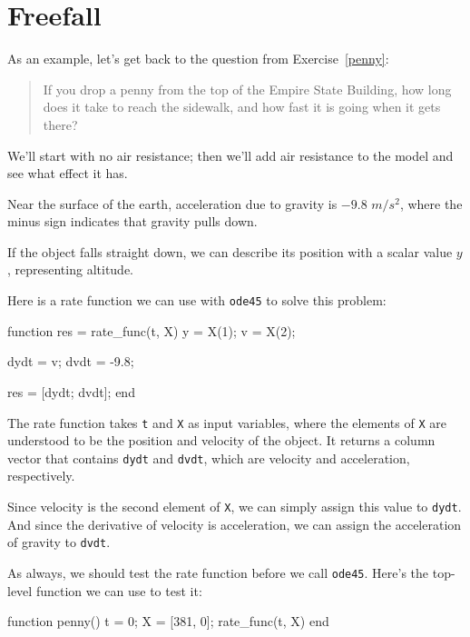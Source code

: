 \documentclass[
]{book}
\numberwithin{Answer}{chapter}
\numberwithin{Exercise}{chapter}
\begin{document}
\section{Freefall}
\label{sect:freefall}

As an example, let's get back to the question from Exercise~\ref{penny}:

\begin{quote}
If you drop a penny from the top of the Empire State Building, how long does it take to reach the sidewalk, and how fast it is going when it gets there?
\end{quote}

We'll start with no air resistance; then we'll add air resistance to the model and see what effect it has.

Near the surface of the earth,
acceleration due to gravity is $-9.8$ $m/s^2$, where the minus sign
indicates that gravity pulls down.

If the object falls straight down, we can describe its position with a
scalar value $y$, representing altitude.

Here is a rate function we can use with {\tt ode45} to solve
this problem:

\begin{code}
function res = rate_func(t, X)
    y = X(1);      
    v = X(2);      
    
    dydt = v;
    dvdt = -9.8;

    res = [dydt; dvdt];
end
\end{code}

The rate function takes {\tt t} and {\tt X} as input variables, where the elements of {\tt X} are understood to be the position and velocity of the object.
It returns a column vector that contains {\tt dydt} and {\tt dvdt}, which
are velocity and acceleration, respectively.

Since velocity is the second element of {\tt X}, we can simply assign this value to {\tt dydt}.
And since the derivative of velocity is acceleration, we can assign the acceleration of gravity to {\tt dvdt}.

As always, we should test the rate function before we call {\tt ode45}.  Here's the top-level function we can use to test it:

\begin{code}
function penny()
   t = 0;
   X = [381, 0];
   rate_func(t, X)
end
\end{code}
\end{document}

